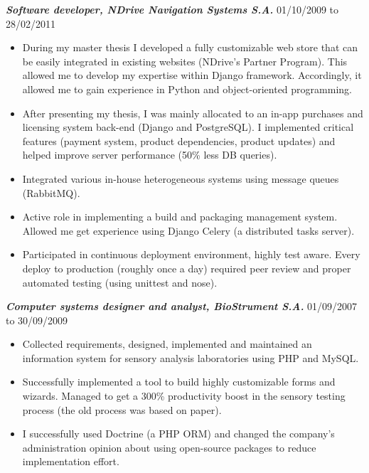 \documentclass[line,margin]{resume}
\begin{document}
\begin{resume}
    {\sl\bf Software developer, NDrive Navigation Systems S.A.} \hfill 01/10/2009 to 28/02/2011
     \begin{itemize}  \itemsep -2pt %
         \item During my master thesis I developed a fully customizable web store that can be easily integrated in existing websites (NDrive's Partner Program). This allowed me to develop my expertise within Django framework. Accordingly, it allowed me to gain experience in Python and object-oriented programming.
         \item After presenting my thesis, I was mainly allocated to an in-app purchases and licensing system back-end (Django and PostgreSQL). I implemented critical features (payment system, product dependencies, product updates) and helped improve server performance (50\% less DB queries).
        \item Integrated various in-house heterogeneous systems using message queues (RabbitMQ).
        \item Active role in implementing a build and packaging management system. Allowed me get experience using Django Celery (a distributed tasks server).
        \item Participated in continuous deployment  environment, highly test aware. Every deploy to production (roughly once a day) required peer review and proper automated testing (using unittest and nose).
     \end{itemize}

    {\sl\bf Computer systems designer and analyst, BioStrument S.A.} \hfill 01/09/2007 to 30/09/2009
     \begin{itemize}  \itemsep -2pt %
         \item Collected requirements, designed, implemented and maintained an information system for sensory analysis laboratories using PHP and MySQL.
         \item Successfully implemented a tool to build highly customizable forms and wizards. Managed to get a 300\% productivity boost in the sensory testing process (the old process was based on paper).
        \item I successfully used Doctrine (a PHP ORM) and changed the company's administration opinion about using open-source packages to reduce implementation effort.
     \end{itemize}


\end{resume}
\end{document}
